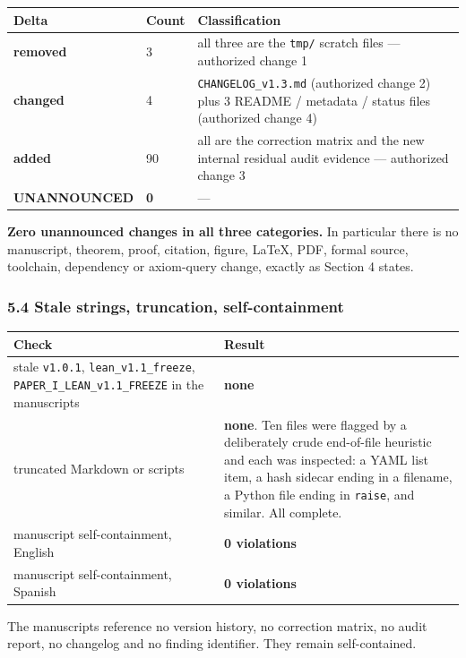 \documentclass[
  9pt,
  a4paper,
]{article}
\newcounter{none} %
\begin{document}
{\def\LTcaptype{none} %
\begin{longtable}[]{@{}lll@{}}
\toprule\noalign{}
Delta & Count & Classification \\
\midrule\noalign{}
\endhead
\bottomrule\noalign{}
\endlastfoot
\textbf{removed} & 3 & all three are the \texttt{tmp/} scratch files ---
authorized change 1 \\
\textbf{changed} & 4 & \texttt{CHANGELOG\_v1.3.md} (authorized change 2)
plus 3 README / metadata / status files (authorized change 4) \\
\textbf{added} & 90 & all are the correction matrix and the new internal
residual audit evidence --- authorized change 3 \\
\textbf{UNANNOUNCED} & \textbf{0} & --- \\
\end{longtable}
}

\textbf{Zero unannounced changes in all three categories.} In particular
there is no manuscript, theorem, proof, citation, figure, LaTeX, PDF,
formal source, toolchain, dependency or axiom-query change, exactly as
Section 4 states.

\subsubsection{5.4 Stale strings, truncation,
self-containment}\label{54-stale-strings-truncation-self-containment}

{\def\LTcaptype{none} %
\begin{longtable}[]{@{}ll@{}}
\toprule\noalign{}
Check & Result \\
\midrule\noalign{}
\endhead
\bottomrule\noalign{}
\endlastfoot
stale \texttt{v1.0.1}, \texttt{lean\_v1.1\_freeze},
\texttt{PAPER\_I\_LEAN\_v1.1\_FREEZE} in the manuscripts &
\textbf{none} \\
truncated Markdown or scripts & \textbf{none}. Ten files were flagged by
a deliberately crude end-of-file heuristic and each was inspected: a
YAML list item, a hash sidecar ending in a filename, a Python file
ending in \texttt{raise}, and similar. All complete. \\
manuscript self-containment, English & \textbf{0 violations} \\
manuscript self-containment, Spanish & \textbf{0 violations} \\
\end{longtable}
}

The manuscripts reference no version history, no correction matrix, no
audit report, no changelog and no finding identifier. They remain
self-contained.
\end{document}
